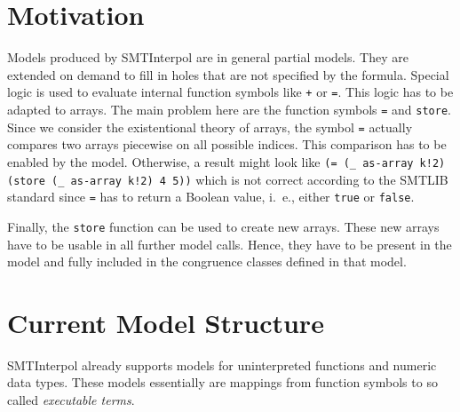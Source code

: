 \documentclass[a4paper,12pt]{article}
\title{Models for Arrays in \si}
\author{J{\"u}rgen Christ}
\date{2013/02/26}
\newcommand\si{SMTInterpol\xspace}
\begin{document}
\theoremstyle{plain}
\newtheorem{corollary}{Corollary}
\theoremstyle{definition}
\newtheorem{defn}{Definition}
\newtheorem{example}{Example}[section]
\theoremstyle{remark}
\newtheorem{rem}{Remark}
\newtheorem{com}{Comment}

\maketitle

\begin{abstract}
  To fully support the theory of arrays, model production in \si has to be
  extended.  This paper describes the general ideas related to the extension
  of the models and highlights why such extensions are needed.  The document
  is intended to be an evolving documentation of the implementation ideas.
\end{abstract}

\section{Motivation}
Models produced by \si are in general partial models.  They are extended on
demand to fill in holes that are not specified by the formula.  Special logic
is used to evaluate internal function symbols like \verb|+| or \verb|=|.  This
logic has to be adapted to arrays.  The main problem here are the function
symbols \verb|=| and \verb|store|.  Since we consider the existentional theory
of arrays, the symbol \verb|=| actually compares two arrays piecewise on all
possible indices.  This comparison has to be enabled by the model.  Otherwise,
a result might look like
\verb|(= (_ as-array k!2) (store (_ as-array k!2) 4 5))|
which is not correct according to the SMTLIB standard since \verb|=| has to
return a Boolean value, i.~e., either \texttt{true} or \texttt{false}.

Finally, the \verb|store| function can be used to create new arrays.  These
new arrays have to be usable in all further model calls.  Hence, they have to
be present in the model and fully included in the congruence classes defined
in that model.

\section{Current Model Structure}
\si already supports models for uninterpreted functions and numeric data
types.  These models essentially are mappings from function symbols to so
called \emph{executable terms}.
\end{document}
